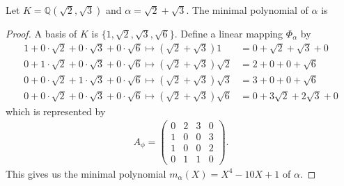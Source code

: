 \begin{example}
    Let \(K = \mathbb{Q}(\sqrt{2}, \sqrt{3})\) and \(\alpha = \sqrt{2}+ \sqrt{3}\). The minimal polynomial of \(\alpha\) is
\end{example}
\begin{proof}
    A basis of \(K\) is \(\{1, \sqrt{2}, \sqrt{3}, \sqrt{6}\}\). Define a linear mapping \(\Phi_\alpha\) by
    \begin{align*}
        1 + 0 \cdot \sqrt{2} + 0 \cdot \sqrt{3} + 0 \cdot \sqrt{6} \mapsto (\sqrt{2} + \sqrt{3}) 1 &= 0 + \sqrt{2} + \sqrt{3} + 0 \\
        0 + 1 \cdot \sqrt{2} + 0 \cdot \sqrt{3} + 0 \cdot \sqrt{6} \mapsto (\sqrt{2} + \sqrt{3}) \sqrt{2} &= 2 + 0 + 0 + \sqrt{6} \\
        0 + 0 \cdot \sqrt{2} + 1 \cdot \sqrt{3} + 0 \cdot \sqrt{6} \mapsto (\sqrt{2} + \sqrt{3}) \sqrt{3} &= 3 + 0 + 0 + \sqrt{6} \\
        0 + 0 \cdot \sqrt{2} + 0 \cdot \sqrt{3} + 0 \cdot \sqrt{6} \mapsto (\sqrt{2} + \sqrt{3}) \sqrt{6} &= 0 + 3 \sqrt{2} + 2 \sqrt{3} + 0
    \end{align*}
    which is represented by
    \begin{align*}
        A_\phi = \begin{pmatrix}
            0 & 2 & 3 & 0 \\
            1 & 0 & 0 & 3 \\
            1 & 0 & 0 & 2 \\
            0 & 1 & 1 & 0
        \end{pmatrix} \text{.}
    \end{align*}
    This gives us the minimal polynomial \(m_\alpha(X) = X^4 - 10 X + 1\) of \(\alpha\).
\end{proof}

